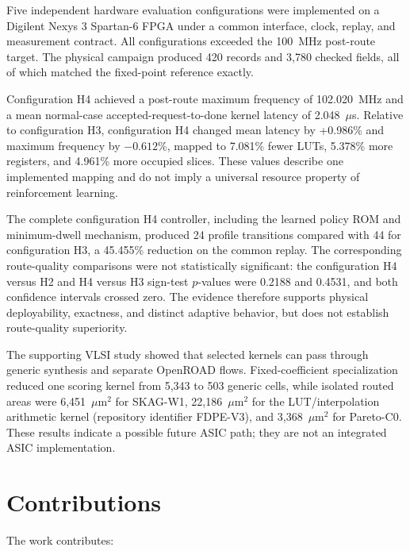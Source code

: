 Five independent hardware evaluation configurations were implemented on a Digilent
Nexys 3 Spartan-6 FPGA under a common interface, clock, replay, and measurement
contract. All configurations exceeded the 100~MHz post-route target. The physical
campaign produced 420 records and 3,780 checked fields, all of which matched the
fixed-point reference exactly.

Configuration H4 achieved a post-route maximum frequency of 102.020~MHz and a mean
normal-case accepted-request-to-done kernel latency of 2.048~$\mu$s. Relative to
configuration H3, configuration H4 changed mean latency by +0.986\% and maximum
frequency by $-0.612$\%, mapped to 7.081\% fewer LUTs, 5.378\% more registers, and
4.961\% more occupied slices. These values describe one implemented mapping and do
not imply a universal resource property of reinforcement learning.

The complete configuration H4 controller, including the learned policy ROM and
minimum-dwell mechanism, produced 24 profile transitions compared with 44 for
configuration H3, a 45.455\% reduction on the common replay. The corresponding
route-quality comparisons were not statistically significant: the configuration H4
versus H2 and H4 versus H3 sign-test $p$-values were 0.2188 and 0.4531, and both
confidence intervals crossed zero. The evidence therefore supports physical
deployability, exactness, and distinct adaptive behavior, but does not establish
route-quality superiority.

The supporting VLSI study showed that selected kernels can pass through generic
synthesis and separate OpenROAD flows. Fixed-coefficient specialization reduced one
scoring kernel from 5,343 to 503 generic cells, while isolated routed areas were
6,451~$\mu\mathrm{m}^{2}$ for SKAG-W1, 22,186~$\mu\mathrm{m}^{2}$ for the
LUT/interpolation arithmetic kernel (repository identifier FDPE-V3), and
3,368~$\mu\mathrm{m}^{2}$ for Pareto-C0. These results indicate a possible future
ASIC path; they are not an integrated ASIC implementation.

\section{Contributions}

The work contributes:

